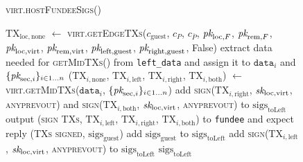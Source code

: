 \begin{figure}[H]
  \begin{processbox}{\textsc{virt.hostFundeeSigs}()}
    \begin{algorithmic}[1]
      \State $\mathrm{TX}_{\mathrm{loc}, \mathrm{none}}$ $\gets$
      \textsc{virt.getEdgeTXs}($c_{\mathrm{guest}}$, $c_P$, $c_{\bar{P}}$,
      $\textit{pk}_{\mathrm{loc}, F}$, $\textit{pk}_{\mathrm{rem}, F}$, $\textit{pk}_{\mathrm{loc},
      \mathrm{virt}}$, $\textit{pk}_{\mathrm{rem}, \mathrm{virt}}$,
      $\textit{pk}_{\mathrm{left}, \mathrm{guest}}$, $\textit{pk}_{\mathrm{right},
      \mathrm{guest}}$, False)
        \State extract data needed for \textsc{getMidTXs}() from
        \texttt{left\_data} and assign it to $\texttt{data}_i$ and
        $\{\textit{pk}_{\mathrm{sec}, i}\}_{i \in 1 \dots n}$
        \State ($\mathrm{TX}_{i, \mathrm{none}}$, $\mathrm{TX}_{i,
        \mathrm{left}}$, $\mathrm{TX}_{i, \mathrm{right}}$, $\mathrm{TX}_{i,
        \mathrm{both}}$) $\gets$ \textsc{virt.getMidTXs}($\texttt{data}_i$,
        $\{\textit{pk}_{\mathrm{sec}, i}\}_{i \in 1 \dots n}$)
        \State add \textsc{sign}($\mathrm{TX}_{i, \mathrm{right}}$,
        $\textit{sk}_{\mathrm{loc}, \mathrm{virt}}$, \textsc{anyprevout}) and
        \textsc{sign}($\mathrm{TX}_{i, \mathrm{both}}$, $\textit{sk}_{\mathrm{loc},
        \mathrm{virt}}$, \textsc{anyprevout}) to
        $\mathrm{sigs}_{\mathrm{toLeft}}$ 
        \State output (\textsc{sign TXs}, $\mathrm{TX}_{i, \mathrm{left}}$,
        $\mathrm{TX}_{i, \mathrm{right}}$, $\mathrm{TX}_{i, \mathrm{both}}$)
        to \texttt{fundee} and expect reply (\textsc{TXs signed},
        $\mathrm{sigs}_{\mathrm{guest}}$)
        \State add $\mathrm{sigs}_{\mathrm{guest}}$ to
        $\mathrm{sigs}_{\mathrm{toLeft}}$
         
          \State add \textsc{sign}($\mathrm{TX}_{i, \mathrm{left}}$,
          $\textit{sk}_{\mathrm{loc}, \mathrm{virt}}$, \textsc{anyprevout}) to
          $\mathrm{sigs}_{\mathrm{toLeft}}$
        \EndIf
      \EndFor
      \State \Return $\mathrm{sigs}_{\mathrm{toLeft}}$
    \end{algorithmic}
  \end{processbox}
  \caption{}
  \label{code:virtual-layer:fundee-sigs}
\end{figure}

